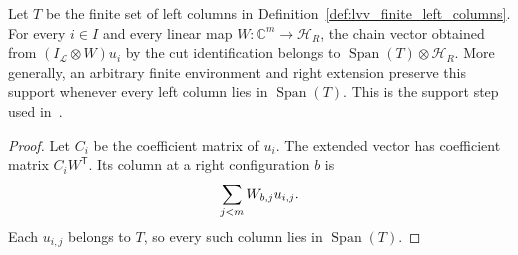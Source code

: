 \begin{lemma}
    \label{thm:lvv_left_columns_right_extension}
    \leanok
    Let $T$ be the finite set of left columns in
    Definition~\ref{def:lvv_finite_left_columns}.
    For every $i\in I$ and every linear map $W:\mathbb C^m\to\mathcal H_R$,
    the chain vector obtained from $(I_{\mathcal L}\otimes W)u_i$ by the
    cut identification belongs to $\operatorname{Span}(T)\otimes\mathcal H_R$.
    More generally, an arbitrary finite environment and right extension
    preserve this support whenever every left column lies in
    $\operatorname{Span}(T)$.
    This is the support step used
    in~\cite[Claim~2.7, source lines 520--527]{Landau2015Polynomial}.
\end{lemma}
\begin{proof}\leanok
    Let $C_i$ be the coefficient matrix of $u_i$. The extended vector has
    coefficient matrix $C_iW^{\mathsf T}$. Its column at a right
    configuration $b$ is
    \begin{align}
        \sum_{j<m}W_{b,j}u_{i,j}.\notag
    \end{align}
    Each $u_{i,j}$ belongs to $T$, so every such column lies in
    $\operatorname{Span}(T)$.
\end{proof}
